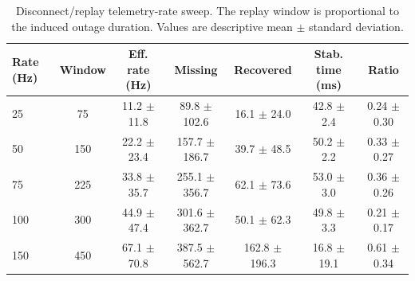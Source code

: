 \begin{table}[t]
\centering
\caption{Disconnect/replay telemetry-rate sweep. The replay window is proportional to the induced outage duration. Values are descriptive mean $\pm$ standard deviation.}
\label{tab:disconnect_replay_rate_sweep}
\scriptsize
\begin{tabular}{lcccccc}
\hline
Rate (Hz) & Window & Eff. rate (Hz) & Missing & Recovered & Stab. time (ms) & Ratio \\
\hline
25 & 75 & 11.2 $\pm$ 11.8 & 89.8 $\pm$ 102.6 & 16.1 $\pm$ 24.0 & 42.8 $\pm$ 2.4 & 0.24 $\pm$ 0.30 \\
50 & 150 & 22.2 $\pm$ 23.4 & 157.7 $\pm$ 186.7 & 39.7 $\pm$ 48.5 & 50.2 $\pm$ 2.2 & 0.33 $\pm$ 0.27 \\
75 & 225 & 33.8 $\pm$ 35.7 & 255.1 $\pm$ 356.7 & 62.1 $\pm$ 73.6 & 53.0 $\pm$ 3.0 & 0.36 $\pm$ 0.26 \\
100 & 300 & 44.9 $\pm$ 47.4 & 301.6 $\pm$ 362.7 & 50.1 $\pm$ 62.3 & 49.8 $\pm$ 3.3 & 0.21 $\pm$ 0.17 \\
150 & 450 & 67.1 $\pm$ 70.8 & 387.5 $\pm$ 562.7 & 162.8 $\pm$ 196.3 & 16.8 $\pm$ 19.1 & 0.61 $\pm$ 0.34 \\
\hline
\end{tabular}
\end{table}